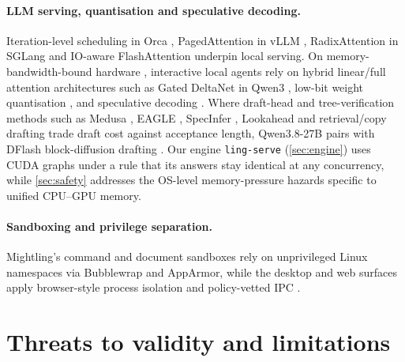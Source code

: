 \documentclass[11pt]{article}
\newcommand{\code}[1]{\texttt{#1}}
\begin{document}
\paragraph{LLM serving, quantisation and speculative decoding.} Iteration-level scheduling in Orca
\cite{yu2022orca}, PagedAttention in vLLM \cite{kwon2023vllm}, RadixAttention in SGLang
\cite{zheng2023sglang} and IO-aware FlashAttention \cite{dao2022flashattention,dao2023flashattention2}
underpin local serving. On memory-bandwidth-bound hardware \cite{williams2009roofline,pope2022scaling},
interactive local agents rely on hybrid linear/full attention architectures such as Gated DeltaNet
\cite{yang2024deltanet,yang2025gateddeltanet} in Qwen3 \cite{qwen3tr}, low-bit weight quantisation
\cite{frantar2022gptq,lin2023awq,cheng2023autoround,ocpmx2023,nvfp4blog},
and speculative decoding \cite{stern2018blockwise,leviathan2023speculative,chen2023speculative,xia2024survey}.
Where draft-head and tree-verification methods such as Medusa \cite{cai2024medusa}, EAGLE
\cite{li2024eagle,li2024eagle2,li2025eagle3}, SpecInfer \cite{miao2023specinfer}, Lookahead
\cite{fu2024lookahead} and retrieval/copy drafting \cite{he2023rest,lan2023copy,saxena2023pld}
trade draft cost against acceptance length, Qwen3.8-27B pairs with DFlash block-diffusion drafting
\cite{chen2026dflash,dflash2drafter}. Our engine \code{ling-serve} (\cref{sec:engine}) uses CUDA
graphs \cite{cudaguide} under a rule that its answers stay identical at any concurrency, while \cref{sec:safety}
addresses the OS-level memory-pressure hazards \cite{linuxpsi} specific to unified CPU--GPU memory.

\paragraph{Sandboxing and privilege separation.} Mightling's command and document sandboxes rely on
unprivileged Linux namespaces via Bubblewrap \cite{bubblewrap2024} and AppArmor, while the desktop
and web surfaces apply browser-style process isolation and policy-vetted IPC
\cite{barth2008browser,reis2019siteisolation,electron2026security}.

\section{Threats to validity and limitations}
\label{sec:limits}
\end{document}
